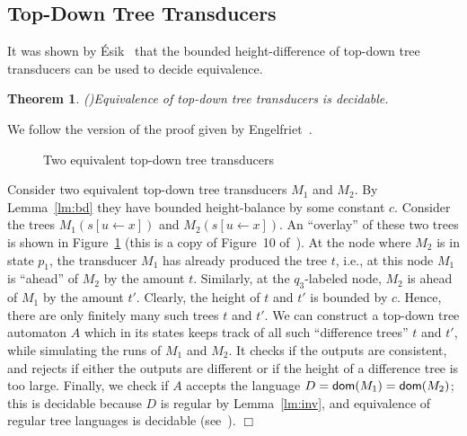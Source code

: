 \documentclass[copyright,creativecommons]{eptcs}
\newtheorem{theorem}{Theorem}
\newcommand{\eop}{\hspace*{\fill}$\Box$}
\newenvironment{proof}{{\it Proof.}\quad}{\eop\vspace*{4mm}}
\newcommand{\dom}[1]{{\sf dom}(#1)}
\begin{document}
\subsection{Top-Down Tree Transducers}\label{sect:td}

It was shown by {\'E}sik~\cite{DBLP:journals/actaC/Esik81} 
that the bounded height-difference 
of top-down tree transducers can be used to decide equivalence. 

\begin{theorem}\rm(\cite{DBLP:journals/actaC/Esik81})\label{theo:Esik}
Equivalence of top-down tree transducers is decidable.
\end{theorem}
\begin{proof}
We follow the version of the proof given by Engelfriet~\cite{eng80}.
\begin{figure}[htb]
\centerline{}
\caption{Two equivalent top-down tree transducers}\label{fig:joost}
\end{figure}
Consider two equivalent top-down tree transducers $M_1$ and $M_2$.
By Lemma~\ref{lm:bd} they have bounded height-balance by some constant $c$.
Consider the trees $M_1(s[u\leftarrow x])$ and
$M_2(s[u\leftarrow x])$. An ``overlay'' of these two trees is
shown in Figure~\ref{fig:joost} (this is a copy of Figure~10 of~\cite{eng80}).
At the node where $M_2$ is in state $p_1$, the transducer $M_1$ has
already produced the tree $t$, i.e., at this node 
$M_1$ is ``ahead'' of $M_2$ by the amount $t$.
Similarly, at the $q_3$-labeled node, $M_2$ is ahead of $M_1$
by the amount $t'$.
Clearly, the height of $t$ and $t'$ is bounded by $c$. 
Hence, there are only finitely many such trees $t$ and $t'$.
We can construct a top-down tree automaton $A$ which in its states
keeps track of all such ``difference trees'' $t$ and $t'$, while
simulating the runs of $M_1$ and $M_2$. It checks if the outputs are
consistent, and rejects if either the outputs are different or if 
the height of a difference tree is too large.
Finally, we check if $A$ accepts the language $D=\dom{M_1}=\dom{M_2}$; this is
decidable because $D$ is regular by Lemma~\ref{lm:inv}, and equivalence
of regular tree languages is decidable (see~\cite{tata07}).
\end{proof}
\end{document}
